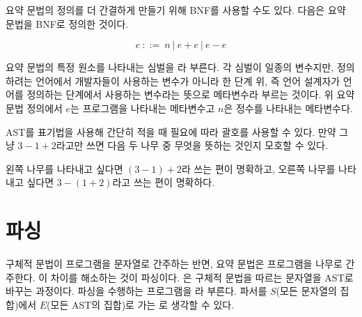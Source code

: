 요약 문법의 정의를 더 간결하게 만들기 위해 BNF를 사용할 수도 있다. 다음은
 요약 문법을 BNF로 정의한 것이다.

\[e\ ::=\ n\ |\ e+e\ |\ e-e\]

요약 문법의 특정 원소를 나타내는 심벌을 라 부른다.
각 심벌이 일종의 변수지만, 정의하려는 언어에서 개발자들이 사용하는 변수가 아니라
한 단계 위, 즉 언어 설계자가 언어를 정의하는 단계에서 사용하는 변수라는 뜻으로
메타변수라 부르는 것이다. 위 요약 문법 정의에서 $e$는 프로그램을 나타내는
메타변수고 $n$은 정수를 나타내는 메타변수다.

AST를 표기법을 사용해 간단히 적을 때 필요에 따라 괄호를 사용할 수 있다. 만약
그냥 $3-1+2$라고만 쓰면 다음 두 나무 중 무엇을 뜻하는 것인지 모호할 수 있다.

\begin{center}
\end{center}

왼쪽 나무를 나타내고 싶다면 $(3-1)+2$라 쓰는 편이 명확하고, 오른쪽 나무를
나타내고 싶다면 $3-(1+2)$라고 쓰는 편이 명확하다.

\section{파싱}

구체적 문법이 프로그램을 문자열로 간주하는 반면, 요약 문법은 프로그램을 나무로
간주한다. 이 차이를 해소하는 것이 파싱이다. 은 구체적 문법을 따르는 문자열을
AST로 바꾸는 과정이다. 파싱을 수행하는 프로그램을 라 부른다. 파서를
$S$(모든 문자열의 집합)에서 $E$(모든 AST의 집합)로 가는 로 생각할 수 있다.

